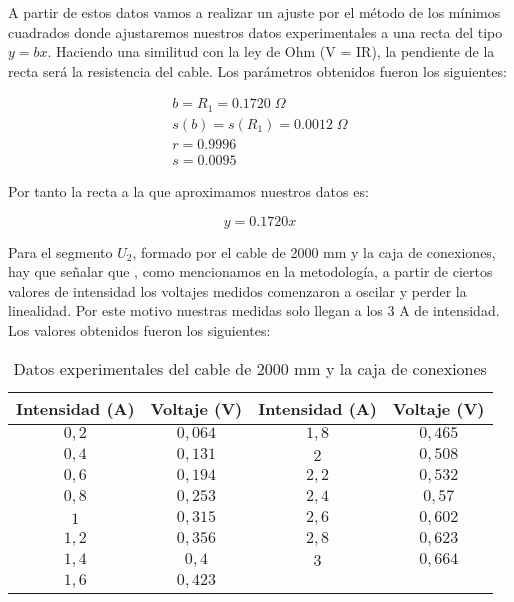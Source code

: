 \documentclass[a4paper,12pt,titlepage]{article}
\begin{document}
A partir de estos datos vamos a realizar un ajuste por el método de los mínimos cuadrados donde ajustaremos nuestros datos experimentales a una recta del tipo $y = bx$. Haciendo una similitud con la ley de Ohm (V = IR), la pendiente de la recta será la resistencia del cable. Los parámetros obtenidos fueron los siguientes:

\begin{equation}
    \begin{gathered}
        b = R_{1} = 0.1720 \; \Omega \\
        s(b) = s(R_{1}) = 0.0012\; \Omega \\
        r =  0.9996 \\
        s =  0.0095
    \end{gathered}
\end{equation}

Por tanto la recta a la que aproximamos nuestros datos es:

\begin{equation}
    y = 0.1720x
\end{equation}

Para el segmento $U_{2}$, formado por el cable de 2000 mm y la caja de conexiones, hay que señalar que , como mencionamos en la metodología, a partir de ciertos valores de intensidad los voltajes medidos comenzaron a oscilar y perder la linealidad. Por este motivo nuestras medidas solo llegan a los $3$ A de intensidad. Los valores obtenidos fueron los siguientes:

\begin{table}[h!]
    \centering
    \begin{tabular}{|c|c|c|c|}
        \hline
        Intensidad (A) & Voltaje (V) & Intensidad (A) & Voltaje (V) \\ \hline
        $0,2$ & $0,064$ & $1,8$ & $0,465$ \\ \hline
        $0,4$ & $0,131$ & $2$ & $0,508$ \\\hline
        $0,6$ & $0,194$ & $2,2$ & $0,532$ \\\hline
        $0,8$ & $0,253$ & $2,4$ & $0,57$ \\\hline
        $1$ & $0,315$ & $2,6$ & $0,602$ \\\hline
        $1,2$ & $0,356$ & $2,8$ & $0,623$ \\\hline
        $1,4$ & $0,4$ & $3$ & $0,664$ \\\hline
        $1,6$ & $0,423$ & & \\
    \hline
    \end{tabular}
    \caption{Datos experimentales del cable de 2000 mm y la caja de conexiones}
\end{table}
\end{document}
